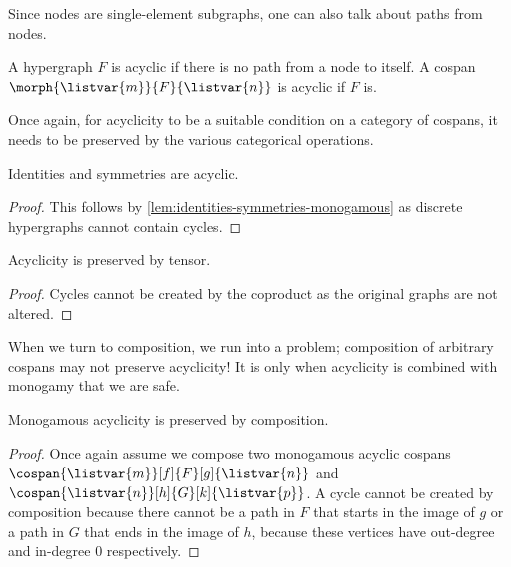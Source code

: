 Since nodes are single-element subgraphs, one can also talk about paths from
nodes.

\begin{definition}
    A hypergraph \(F\) is acyclic if there is no path from a node to itself.
    A cospan \(\morph{\listvar{m}}{F}{\listvar{n}}\) is acyclic if \(F\) is.
\end{definition}

Once again, for acyclicity to be a suitable condition on a category of cospans,
it needs to be preserved by the various categorical operations.

\begin{lemma}\label{lem:identities-symmetries-monogamous-acyclic}
    Identities and symmetries are acyclic.
\end{lemma}
\begin{proof}
    This follows by \cref{lem:identities-symmetries-monogamous} as discrete
    hypergraphs cannot contain cycles.
\end{proof}

\begin{lemma}\label{lem:monogamous-acyclicity-preserved-tensor}
    Acyclicity is preserved by tensor.
\end{lemma}
\begin{proof}
    Cycles cannot be created by the coproduct as the original graphs are not
    altered.
\end{proof}

When we turn to composition, we run into a problem; composition of arbitrary
cospans may not preserve acyclicity!
It is only when acyclicity is combined with monogamy that we are safe.

\begin{lemma}\label{lem:monogamous-acyclicity-preserved-composition}
    Monogamous acyclicity is preserved by composition.
\end{lemma}
\begin{proof}
    Once again assume we compose two monogamous acyclic cospans \(
        \cospan{\listvar{m}}[f]{F}[g]{\listvar{n}}
    \) and \(
        \cospan{\listvar{n}}[h]{G}[k]{\listvar{p}}
    \).
    A cycle cannot be created by composition because there cannot be a path in
    \(F\) that starts in the image of \(g\) or a path in \(G\) that ends in the
    image of \(h\), because these vertices have out-degree and in-degree \(0\)
    respectively.
\end{proof}


